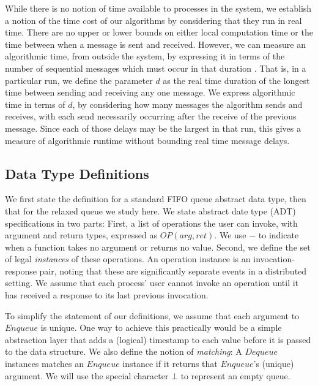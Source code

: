 \documentclass[a4paper,anonymous,USenglish]{lipics-v2021} %
\theoremstyle{definition}
\begin{document}

While there is no notion of time available to processes in the system, we establish a notion of the time cost of our algorithms by considering that they run in real time.  There are no upper or lower bounds on either local computation time or the time between when a message is sent and received.  However, we can measure an algorithmic time, from outside the system, by expressing it in terms of the number of sequential messages which must occur in that duration \cite{AttiyaWelch04}.  That is, in a particular run, we define the parameter $d$ as the real time duration of the longest time between sending and receiving any one message.  We express algorithmic time in terms of $d$, by considering how many messages the algorithm sends and receives, with each send necessarily occurring after the receive of the previous message.  Since each of those delays may be the largest in that run, this gives a measure of algorithmic runtime without bounding real time message delays.  

\subsection{Data Type Definitions}

We first state the definition for a standard FIFO queue abstract data type, then that for the relaxed queue we study here.  We state abstract date type (ADT) specifications in two parts: First, a list of operations the user can invoke, with argument and return types, expressed as $OP(arg,ret)$.  We use $-$ to indicate when a function takes no argument or returns no value.  Second, we define the set of legal \emph{instances} of these operations.  An operation instance is an invocation-response pair, noting that these are significantly separate events in a distributed setting.  We assume that each process' user cannot invoke an operation until it has received a response to its last previous invocation.   

To simplify the statement of our definitions, we assume that each argument to $Enqueue$ is unique.  One way to achieve this practically would be a simple abstraction layer that adds a (logical) timestamp to each value before it is passed to the data structure.  We also define the notion of \emph{matching}: A $Dequeue$ instances matches an $Enqueue$ instance if it returns that $Enqueue$'s (unique) argument.  We will use the special character $\bot$ to represent an empty queue.
\end{document}
